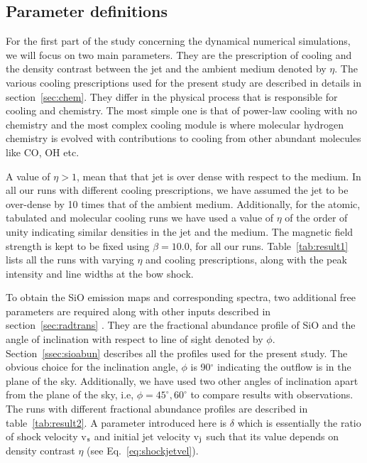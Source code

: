 \documentclass[useAMS,usenatbib,letters]{mn2e}
\begin{document}
\subsection{Parameter definitions}
\label{ssec:paradef}
For the first part of the study concerning the dynamical numerical
simulations, we will focus on two main parameters. They are the
prescription of cooling and the density contrast between the jet and
the ambient medium denoted by $\eta$. The various cooling prescriptions used for the present study are
described in details in section~\ref{sec:chem}. They differ in the
physical process that is responsible for cooling and chemistry. The
most simple one is that of power-law cooling with no chemistry and the
most complex cooling module is where molecular hydrogen chemistry is
evolved with contributions to cooling from other abundant molecules
like CO, OH etc. 
%

A value of $\eta > 1$, mean that
that jet is over dense with respect to the medium. In all our runs with
different cooling prescriptions, we have assumed the jet to be
over-dense by 10 times that of the ambient medium. Additionally, for
the atomic, tabulated and molecular cooling runs we have used a
value of $\eta$ of the order of unity indicating similar densities in
the jet and the medium. 
The magnetic field strength is kept to be fixed using $\beta = 10.0$,
for all our runs. Table~\ref{tab:result1} lists all the runs with
varying $\eta$ and cooling prescriptions, along with the peak
intensity and line widths at the bow shock.
%

To obtain the SiO emission maps and corresponding
spectra, two additional free parameters are required along with other
inputs described in section~\ref{sec:radtrans} . They are
the fractional abundance profile of SiO and the angle of inclination with
respect to line of sight denoted by $\phi$. Section~\ref{ssec:sioabun}
describes all the profiles used for the present study. The obvious
choice for the inclination angle, $\phi$ is 90$^{\circ}$ indicating
the outflow is in the plane of the sky. 
Additionally, we have used two other angles of inclination apart from the
plane of the sky, i.e, $\phi = 45^{\circ}, 60^{\circ}$ to compare
results with observations. The runs with different fractional
abundance profiles are described in table~\ref{tab:result2}. A
parameter introduced here is $\delta$ which is essentially the ratio
of shock velocity v$_{\rm s}$ and initial jet velocity v$_{\rm
  j}$ such that its value depends on density contrast $\eta$
(see Eq.~\ref{eq:shockjetvel}).
\end{document}
